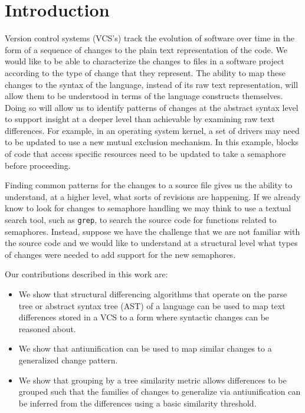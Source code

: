 \section{Introduction}

Version control systems (VCS's) track the evolution of software over time in the form
of a sequence of changes to the plain text representation of the code.
We would like to be able to characterize the changes to files in a software
project according to the type of change that they represent.  The ability to
map these changes to the syntax of the language, instead of its raw text
representation, will allow them to be understood in terms of the language
constructs themselves.  Doing so will allow us to identify patterns of
changes at the abstract syntax level to support insight at a deeper level
than achievable by examining raw text differences.  For example, in
an operating system kernel, a set of drivers may need to be updated to use a
new mutual exclusion mechanism. In this example, blocks of code that access
specific resources need to be updated to take a semaphore before proceeding.

Finding common patterns for the changes to a source file gives us the ability
to understand, at a higher level, what sorts of revisions are happening. If we
already know to look for changes to semaphore handling we may think to use a
textual search tool, such as {\tt grep}, to search the source code for
functions related to semaphores. Instead, suppose we have the challenge that we
are not familiar with the source code and we would like to understand at a
structural level what types of changes were needed to add support for the new
semaphores.

Our contributions described in this work are:

\begin{itemize}

\item We show that structural differencing algorithms that operate on the
parse tree or abstract syntax tree (AST) of a language can be used to map text
differences stored in a VCS to a form where syntactic changes can be reasoned
about.

\item We show that antiunification can be used to map similar changes to a
generalized change pattern.

\item We show that grouping by a tree similarity metric allows differences to
be grouped such that the families of changes to generalize via antiunification
can be inferred from the differences using a basic similarity threshold.

\end{itemize}

